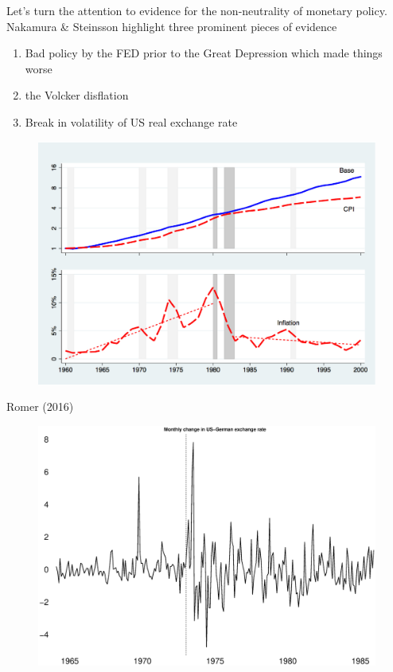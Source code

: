 \documentclass{beamer}
\begin{document}
\begin{frame}
 Let's turn the attention to evidence for the non-neutrality of monetary policy. 
 Nakamura \& Steinsson highlight three prominent pieces of evidence
 \begin{enumerate}
   \item Bad policy by the FED prior to the Great Depression which made things worse
   \item the Volcker disflation
   \item Break in volatility of US real exchange rate
 \end{enumerate} 
\end{frame}

\begin{frame}
  \begin{figure}
    \includegraphics[scale=.7]{romer.eps}
  \end{figure}
  Romer (2016)
\end{frame}


\begin{frame}
  \begin{figure}
    \includegraphics[scale=.3]{exchange_rate.eps}
  \end{figure}  
\end{frame}
\end{document}
